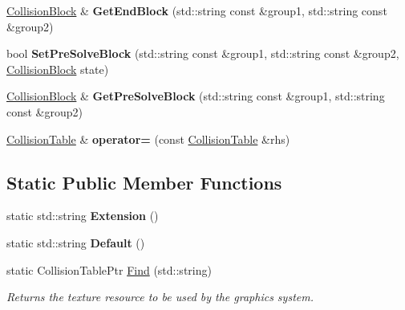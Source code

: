 \begin{DoxyCompactItemize}
\item 
\hypertarget{classDCEngine_1_1CollisionTable_ad20d1db90d96c45dd81855d158bfa0c8}{\hyperlink{structDCEngine_1_1CollisionBlock}{Collision\-Block} \& {\bfseries Get\-End\-Block} (std\-::string const \&group1, std\-::string const \&group2)}\label{classDCEngine_1_1CollisionTable_ad20d1db90d96c45dd81855d158bfa0c8}

\item 
\hypertarget{classDCEngine_1_1CollisionTable_a6ced5ff7731c9213bbe906fe49b49249}{bool {\bfseries Set\-Pre\-Solve\-Block} (std\-::string const \&group1, std\-::string const \&group2, \hyperlink{structDCEngine_1_1CollisionBlock}{Collision\-Block} state)}\label{classDCEngine_1_1CollisionTable_a6ced5ff7731c9213bbe906fe49b49249}

\item 
\hypertarget{classDCEngine_1_1CollisionTable_af484901e98e2e095275179d6da442208}{\hyperlink{structDCEngine_1_1CollisionBlock}{Collision\-Block} \& {\bfseries Get\-Pre\-Solve\-Block} (std\-::string const \&group1, std\-::string const \&group2)}\label{classDCEngine_1_1CollisionTable_af484901e98e2e095275179d6da442208}

\item 
\hypertarget{classDCEngine_1_1CollisionTable_a2ebb6549e1196033a3fc009e89b68bf5}{\hyperlink{classDCEngine_1_1CollisionTable}{Collision\-Table} \& {\bfseries operator=} (const \hyperlink{classDCEngine_1_1CollisionTable}{Collision\-Table} \&rhs)}\label{classDCEngine_1_1CollisionTable_a2ebb6549e1196033a3fc009e89b68bf5}

\end{DoxyCompactItemize}
\subsection*{Static Public Member Functions}
\begin{DoxyCompactItemize}
\item 
\hypertarget{classDCEngine_1_1CollisionTable_aad8cd32be9076a01c3a504fa7f2b8b29}{static std\-::string {\bfseries Extension} ()}\label{classDCEngine_1_1CollisionTable_aad8cd32be9076a01c3a504fa7f2b8b29}

\item 
\hypertarget{classDCEngine_1_1CollisionTable_a6e539c29d2880a2ecebba0fea92dc2ca}{static std\-::string {\bfseries Default} ()}\label{classDCEngine_1_1CollisionTable_a6e539c29d2880a2ecebba0fea92dc2ca}

\item 
static Collision\-Table\-Ptr \hyperlink{classDCEngine_1_1CollisionTable_a0f0c06d17cbb12699b923cdc70445db1}{Find} (std\-::string)
\begin{DoxyCompactList}\small\item\em Returns the texture resource to be used by the graphics system. \end{DoxyCompactList}\end{DoxyCompactItemize}
